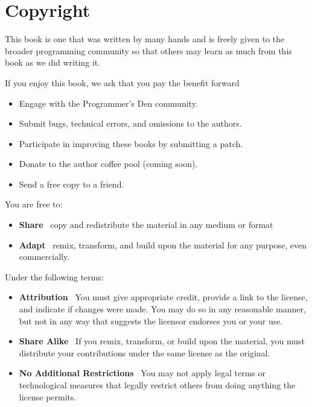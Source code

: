 \documentclass[../main.tex]{subfiles}
\begin{document}
\newcommand*{\csp}{\hspace{0.15\textwidth}}

\chapter*{Copyright}

This book is one that was written by many hands and is freely
given to the broader programming community so that others may learn as
much from this book as we did writing it.

\vspace{1cm}

If you enjoy this book, we ask that you pay the benefit forward \textemdash
\begin{itemize}
    \item Engage with the Programmer's Den community.
    \item Submit bugs, technical errors, and omissions to the authors.
    \item Participate in improving these books by submitting a patch.
    \item Donate to the author coffee pool (coming soon).
    \item Send a free copy to a friend.
\end{itemize}

\vspace{1cm}

You are free to:
\begin{itemize}
    \item \textbf{Share} \textemdash\  copy and redistribute the
        material in any medium or format
        
    \item \textbf{Adapt} \textemdash\  remix, transform, and build
        upon the material for any purpose, even commercially.
\end{itemize}

\vspace{0.5cm}

Under the following terms:
\begin{itemize}
    \item \textbf{Attribution} \textemdash\  You must give appropriate
        credit, provide a link to the license, and indicate if changes
        were made. You may do so in any reasonable manner, but not in
        any way that suggests the licensor endorses you or your use.
    
    \item \textbf{Share Alike} \textemdash\  If you remix, transform, or
        build upon the material, you must distribute your contributions
        under the same license as the original.
    
    \item \textbf{No Additional Restrictions} \textemdash\  You may not
        apply legal terms or technological measures that legally restrict
        others from doing anything the license permits.
\end{itemize}
\end{document}
